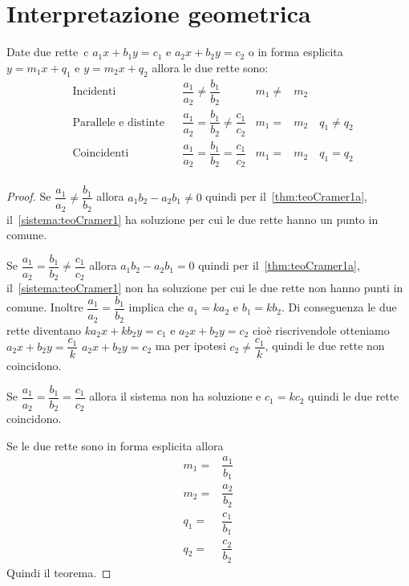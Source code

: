 \section{Interpretazione geometrica}
\begin{thm}[rette]
	Date due rette~\cite{Zwirner1988}c $a_1x+b_1y=c_1$ e $a_2x+b_2y=c_2$ o in forma esplicita $y=m_1x+q_1$ e $y=m_2x+q_2$ allora le due rette sono:
\begin{align*}
&\text{Incidenti}&&\dfrac{a_1}{a_2}\neq\dfrac{b_1}{b_2}&m_1\neq& m_2\\
&\text{Parallele e distinte}&&\dfrac{a_1}{a_2}=\dfrac{b_1}{b_2}\neq\dfrac{c_1}{c_2}&m_1=& m_2\quad q_1\neq q_2\\
&\text{Coincidenti}&&\dfrac{a_1}{a_2}=\dfrac{b_1}{b_2}=\dfrac{c_1}{c_2}&m_1=& m_2\quad q_1= q_2\\
\end{align*}
\end{thm}
\begin{proof}
Se $\dfrac{a_1}{a_2}\neq\dfrac{b_1}{b_2}$ allora $a_1b_2-a_2b_1\neq 0$ quindi per il~\cref{thm:teoCramer1a}, il~\cref{sistema:teoCramer1} ha soluzione per cui le due rette hanno un punto in comune.

Se $\dfrac{a_1}{a_2}=\dfrac{b_1}{b_2}\neq\dfrac{c_1}{c_2}$ allora $a_1b_2-a_2b_1= 0$ quindi per il~\cref{thm:teoCramer1a}, il~\cref{sistema:teoCramer1} non ha soluzione per cui le due rette non hanno punti in comune. Inoltre $\dfrac{a_1}{a_2}=\dfrac{b_1}{b_2}$ implica che $a_1=ka_2$ e $b_1=kb_2$. Di conseguenza le due rette diventano $ka_2x+kb_2y=c_1$ e $a_2x+b_2y=c_2$ cioè riscrivendole otteniamo $a_2x+b_2y=\dfrac{c_1}{k}$ $a_2x+b_2y=c_2$ ma per ipotesi $c_2\neq\dfrac{c_1}{k}$, quindi le due rette non coincidono.

Se $\dfrac{a_1}{a_2}=\dfrac{b_1}{b_2}=\dfrac{c_1}{c_2}$ allora il sistema non ha soluzione e $c_1=kc_2$ quindi le  due rette coincidono.

Se le due rette sono in forma esplicita allora 
\begin{align*}
m_1=&\dfrac{a_1}{b_1}\\
m_2=&\dfrac{a_2}{b_2}\\
q_1=&\dfrac{c_1}{b_1}\\
q_2=&\dfrac{c_2}{b_2}
\end{align*} 
Quindi il teorema.
\end{proof}